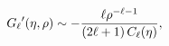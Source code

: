 \[\mathop{G_{\ell}\/}\nolimits'\!\left(\eta,\rho\right)\sim-\frac{\ell\rho^{-%
\ell-1}}{(2\ell+1)\mathop{C_{\ell}\/}\nolimits\!\left(\eta\right)},\]